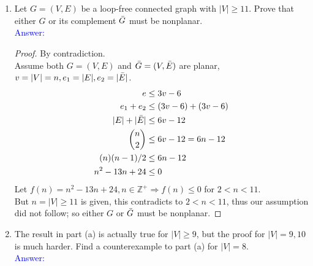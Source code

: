 \documentclass[a4paper]{article}
\begin{document}
\section{}
\begin{enumerate}[label=\alph*)]
    \item Let $G=(V,E)$ be a loop-free connected graph with $|V|\geq11$. Prove that either $G$ or its complement $\Bar{G}$ must be nonplanar.\\
        \textcolor{blue}{Answer:}
        \begin{proof} By contradiction.\\
        Assume both $G=(V,E)$ and $\Bar{G}=(V,\Bar{E})$ are planar, $v=|V|=n, e_1=|E|,e_2=|\Bar{E}|$.
            \begin{align*}
                e&\leq3v-6\\
                e_1+e_2&\leq (3v-6)+(3v-6)\\
                |E|+|\Bar{E}|&\leq 6v-12\\
                \binom{n}{2}&\leq 6v-12=6n-12\\
                {(n)(n-1)}/{2}&\leq 6n-12\\
                n^2-13n+24&\leq 0
            \end{align*}
            Let $f(n)=n^2-13n+24,n\in\mathbb{Z^+}\Rightarrow f(n)\leq0$ for $2<n<11$.\\
            But $n=|V|\geq11$ is given, this contradicts to $2<n<11$, thus our assumption did not follow; so either $G$ or $\Bar{G}$ must be nonplanar.
        \end{proof}
    \item The result in part (a) is actually true for $|V|\geq 9$, but the proof for $|V|=9,10$ is much harder. Find a counterexample to part (a) for $|V|=8$.\\
        \textcolor{blue}{Answer:}
        \begin{figure}[!htbp]
            \begin{subfigure}[!htbp]{0.5\textwidth}
                \centering
\end{subfigure}
\end{figure}
\end{enumerate}
\end{document}

